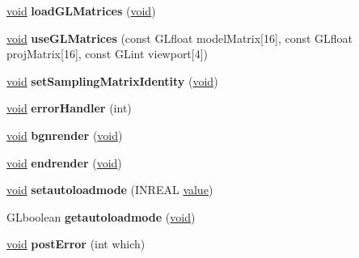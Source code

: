 \begin{DoxyCompactItemize}
\item 
\mbox{\label{class_g_l_unurbs_adbf3a558887515183d4c95b1cfe43d45}} 
\hyperlink{interfacevoid}{void} {\bfseries load\+G\+L\+Matrices} (\hyperlink{interfacevoid}{void})
\item 
\mbox{\label{class_g_l_unurbs_a66bbb6959ca5fff7d83b173bf608b4f6}} 
\hyperlink{interfacevoid}{void} {\bfseries use\+G\+L\+Matrices} (const G\+Lfloat model\+Matrix\mbox{[}16\mbox{]}, const G\+Lfloat proj\+Matrix\mbox{[}16\mbox{]}, const G\+Lint viewport\mbox{[}4\mbox{]})
\item 
\mbox{\label{class_g_l_unurbs_a257b96390ccf672f5026f5dba70607d5}} 
\hyperlink{interfacevoid}{void} {\bfseries set\+Sampling\+Matrix\+Identity} (\hyperlink{interfacevoid}{void})
\item 
\mbox{\label{class_g_l_unurbs_a7c42fc3b6216fac79655d71c21854a41}} 
\hyperlink{interfacevoid}{void} {\bfseries error\+Handler} (int)
\item 
\mbox{\label{class_g_l_unurbs_abe004d619bee25f44e50a9bb1783be39}} 
\hyperlink{interfacevoid}{void} {\bfseries bgnrender} (\hyperlink{interfacevoid}{void})
\item 
\mbox{\label{class_g_l_unurbs_ac10fb8feeafacd3b673537d0c71f4a47}} 
\hyperlink{interfacevoid}{void} {\bfseries endrender} (\hyperlink{interfacevoid}{void})
\item 
\mbox{\label{class_g_l_unurbs_a56808b6f625d8133e4cd88fc7e57c171}} 
\hyperlink{interfacevoid}{void} {\bfseries setautoloadmode} (I\+N\+R\+E\+AL \hyperlink{unionvalue}{value})
\item 
\mbox{\label{class_g_l_unurbs_a8b612e70521e7aa7ce64aa9654452328}} 
G\+Lboolean {\bfseries getautoloadmode} (\hyperlink{interfacevoid}{void})
\item 
\mbox{\label{class_g_l_unurbs_aa84cf1c3411432d053082f5d3d1beccd}} 
\hyperlink{interfacevoid}{void} {\bfseries post\+Error} (int which)
\item 

\end{DoxyCompactItemize}

